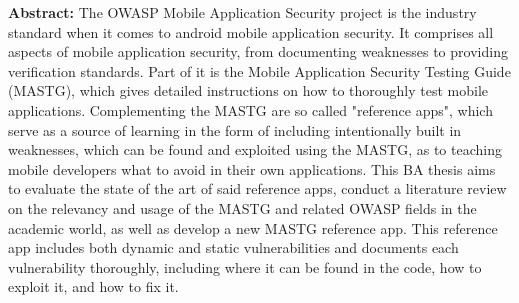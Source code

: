 \textbf{Abstract:} \hspace{0.3cm} The OWASP Mobile Application Security project is the industry standard when it comes to android mobile application security. It comprises all aspects of mobile application security, from documenting weaknesses to providing verification standards. Part of it is the Mobile Application Security Testing Guide (MASTG), which gives detailed instructions on how to thoroughly test mobile applications. Complementing the MASTG are so called "reference apps", which serve as a source of learning in the form of including intentionally built in weaknesses, which can be found and exploited using the MASTG, as to teaching mobile developers what to avoid in their own applications. This BA thesis aims to evaluate the state of the art of said reference apps, conduct a literature review on the relevancy and usage of the MASTG and related OWASP fields in the academic world, as well as develop a new MASTG reference app. This reference app includes both dynamic and static vulnerabilities and documents each vulnerability thoroughly, including where it can be found in the code, how to exploit it, and how to fix it.